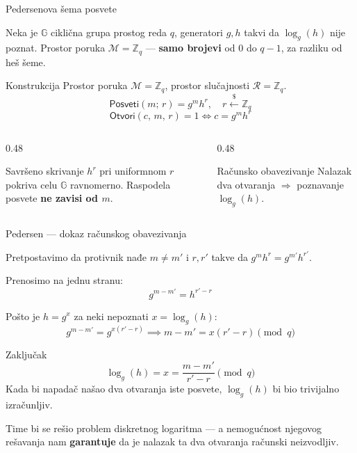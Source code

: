\documentclass[aspectratio=1610]{beamer}
\newcommand{\keyword}[1]{\textcolor{wcprimary}{\textbf{#1}}}
\begin{document}
\begin{frame}{Pedersenova šema posvete}

Neka je $\mathbb{G}$ ciklična grupa prostog reda $q$, generatori $g, h$ takvi da $\log_g(h)$ nije poznat.
Prostor poruka $\mathcal{M} = \mathbb{Z}_q$ — \keyword{samo brojevi} od $0$ do $q-1$, za razliku od heš šeme.

\begin{block}{Konstrukcija}
  Prostor poruka $\mathcal{M} = \mathbb{Z}_q$, prostor slučajnosti $\mathcal{R} = \mathbb{Z}_q$.
  \[
    \mathsf{Posveti}(m;\, r) = g^m h^r, \quad r \xleftarrow{\$} \mathbb{Z}_q
  \]
  \[
    \mathsf{Otvori}(c,\, m,\, r) = 1 \iff c = g^m h^r
  \]
\end{block}

\begin{columns}
  \begin{column}{0.48\textwidth}
    \begin{exampleblock}{Savršeno skrivanje}
      $h^r$ pri uniformnom $r$ pokriva celu $\mathbb{G}$ ravnomerno.
      Raspodela posvete \keyword{ne zavisi od $m$}.
    \end{exampleblock}
  \end{column}
  \begin{column}{0.48\textwidth}
    \begin{alertblock}{Računsko obavezivanje}
      Nalazak dva otvaranja $\Rightarrow$ poznavanje $\log_g(h)$.
    \end{alertblock}
  \end{column}
\end{columns}
\end{frame}

\begin{frame}{Pedersen — dokaz računskog obavezivanja}

Pretpostavimo da protivnik nađe $m \neq m'$ i $r, r'$ takve da $g^m h^r = g^{m'} h^{r'}$.


Prenosimo na jednu stranu:
\[
  g^{m - m'} = h^{r' - r}
\]


Pošto je $h = g^x$ za neki nepoznati $x = \log_g(h)$:
\[
  g^{m-m'} = g^{x(r'-r)} \implies m - m' = x(r' - r) \pmod{q}
\]


\begin{alertblock}{Zaključak}
  \[
    \log_g(h) = x = \frac{m - m'}{r' - r} \pmod{q}
  \]
  Kada bi napadač našao dva otvaranja iste posvete, $\log_g(h)$ bi bio trivijalno izračunljiv.
\end{alertblock}
  {\footnotesize * Time bi se rešio problem diskretnog logaritma — a nemogućnost njegovog rešavanja nam \keyword{garantuje} da je nalazak ta dva otvaranja računski neizvodljiv.
}
\end{frame}
\end{document}
